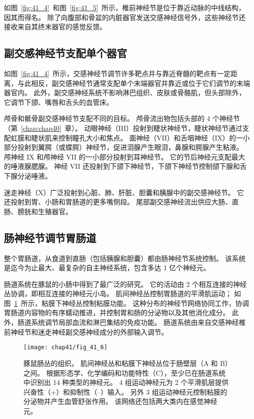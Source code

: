 如图~\ref{fig:41_4}~和图~\ref{fig:41_5}~所示，椎前神经节是位于靠近动脉的中线结构，因其而得名。
除了向腹部和骨盆的内脏器官发送交感神经信号外，这些神经节还接收来自其终末器官的感觉反馈。



\subsection{副交感神经节支配单个器官}

如图~\ref{fig:41_4}~所示，交感神经节调节许多靶点并与靠近脊髓的靶点有一定距离，与此相反，副交感神经节通常支配单个末端器官并靠近或位于它们调节的末端器官内。
此外，副交感神经系统不影响淋巴组织、皮肤或骨骼肌，但头部除外，它调节下颌、嘴唇和舌头的血管床。


颅骨和骶骨副交感神经节支配不同的目标。
颅骨流出物包括头部的 4 个神经节（第~\ref{chap:chap40}~章）。
动眼神经（III）投射到睫状神经节，睫状神经节通过支配虹膜和睫状肌来控制瞳孔大小和焦点。
面神经（VII）和舌咽神经（IX）的一小部分投射到翼腭（或蝶腭）神经节，促进泪腺产生眼泪，鼻腺和腭腺产生粘液。
颅神经 IX 和颅神经 VII 的一小部分投射到耳神经节。
它的节后神经元支配最大的唾液腺腮腺。
神经 VII 还投射到下颌下神经节，下颌下神经节控制颌下腺和舌下腺分泌唾液。


迷走神经（X）广泛投射到心脏、肺、肝脏、胆囊和胰腺中的副交感神经节。
它还投射到胃、小肠和胃肠道的更多嘴侧段。
尾部副交感神经流出供应大肠、直肠、膀胱和生殖器官。



\subsection{肠神经节调节胃肠道}

整个胃肠道，从食道到直肠（包括胰腺和胆囊）都由肠神经节系统控制。
该系统是迄今为止最大、最复杂的自主神经系统，包含多达 1 亿个神经元。


肠道系统在豚鼠的小肠中得到了最广泛的研究。
它的活动由 2 个相互连接的神经丛协调，即相互连接的神经元小岛。
肌间神经丛控制胃肠道的平滑肌运动；
如图~\ref{fig:41_6}~所示，粘膜下神经丛控制粘膜功能。 
这种分布的神经节网络协同工作，协调胃肠道内容物的有序蠕动推进，并控制胃和肠的分泌物以及其他消化成分。
此外，肠道系统调节局部血流和淋巴集结的免疫功能。
肠道系统由来自交感神经椎前神经节和迷走神经副交感神经成分的外部输入调节。



\begin{figure}[htbp]
	\centering
	\texttt{[image: chap41/fig\_41\_6]}
	\caption{豚鼠肠丛的组织。
		肌间神经丛和粘膜下神经丛位于肠壁层（A 和 B）之间。
		根据形态学、化学编码和功能特性（C），至少已在肠道系统中识别出 14 种类型的神经元。
		4 组运动神经元为 2 个平滑肌层提供兴奋性（+）和抑制性（–）输入。
		另外 3 组运动神经元控制粘膜的分泌物并产生血管舒张作用。
		该网络还包括两大类内在感觉神经元\cite{furness1980types}。}
	\label{fig:41_6}
\end{figure}


